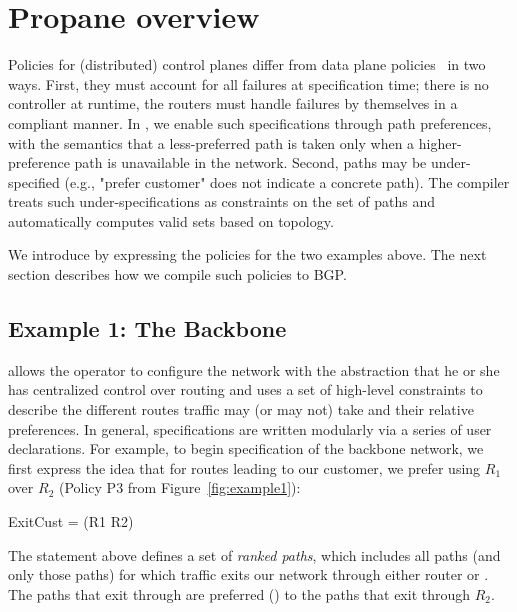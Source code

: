 \section{Propane overview}
\label{sec:propane}

Policies for (distributed) control planes differ from data plane policies~\cite{x,y,z} in two ways. First, they must account for all failures at specification time; there is no controller at runtime, the routers must handle failures by themselves in a compliant manner.
%
In \sysname, we enable such specifications through path preferences, with the semantics that a less-preferred path is taken only when a higher-preference path is unavailable in the network.
%
Second, paths may be under-specified (e.g., "prefer customer" does not indicate a concrete path). The \sysname compiler treats such under-specifications as constraints on the set of paths and automatically computes valid sets based on topology.




We introduce \sysname by expressing the policies for the two examples above.
%
The next section describes how we compile such policies to BGP.

\subsection{Example 1: The Backbone}


\sysname allows the operator to configure the network with the abstraction that he or she has centralized control over routing and uses a set of high-level constraints to describe the different routes traffic may (or may not) take and their relative preferences.
In general, \sysname specifications are written modularly via a series
of user declarations.
For example, to begin specification of the backbone
network, we first express the idea that for routes leading to our customer,
we prefer using $R_1$ over $R_2$ (Policy P3 from Figure~\ref{fig:example1}):
\begin{code}
\Define ExitCust = \Exit(R1 \Prefer R2)
\end{code}
The  statement above defines a set of \emph{ranked paths}, which includes
all paths (and only those paths) for which traffic exits our network
through either router  or .  The paths that exit through 
are preferred (\Prefer) to the paths that exit through $R_2$.

